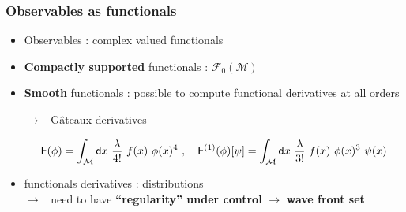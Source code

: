 \documentclass[9pt]{beamer}
\newcommand{\Fcal}{\mathcal{F}}
\newcommand{\Mcal}{\mathcal{M}}
\newcommand{\Fsf}{\mathsf{F}}
\newcommand{\dsf}{\mathsf{d}}
\begin{document}
\begin{frame}[label=obs]

\frametitle{Observables as functionals}

\vfill

\begin{itemize}

\item Observables : complex valued functionals

\item \textbf{Compactly supported} functionals : $\Fcal_0(\Mcal)$ \hfill \hyperlink{details_obs}{}

\item \textbf{Smooth} functionals : possible to compute functional derivatives at all orders

$\to$ \ Gâteaux derivatives \hfill \hyperlink{details_obs}{}

\begin{example}
\vspace*{-25pt}
\begin{equation*}
\Fsf(\phi) = \int_\Mcal \dsf x \ \frac{\lambda}{4!} \ f(x) \ \phi(x)^4 \ , \ \ \  \Fsf^{(1)}(\phi)[\psi] =  \int_\Mcal \dsf x \ \frac{\lambda}{3!} \ f(x) \ \phi(x)^3 \ \psi(x)
\vspace*{-10pt}
\end{equation*}
\end{example}

\item functionals derivatives : distributions \\
$\to$ \ need to have \textbf{``regularity'' under control} $\to$ \textbf{wave front set}

\end{itemize}

\vfill

\end{frame}

\end{document}
